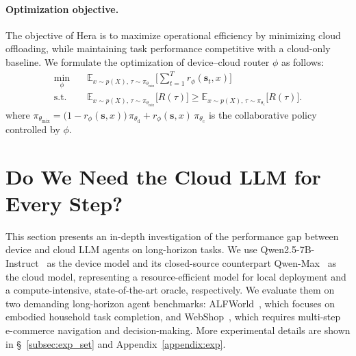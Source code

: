 \documentclass{article}
\newcommand{\name}{Hera\xspace}
\begin{document}
\paragraph{Optimization objective.}
The objective of \name is to maximize operational efficiency by minimizing cloud offloading, while maintaining task performance competitive with a cloud-only baseline.
We formulate the optimization of device--cloud router $\phi$ as follows:
\begin{equation}
\begin{aligned}
\min_{\phi} \quad & 
\mathbb{E}_{x \sim p(X), \, \tau \sim \pi_{\theta_\mathrm{mix}}}
\Bigg[ \sum_{t=1}^T r_\phi(\mathbf{s}_t, x) \Bigg] \\
\text{s.t.} \quad &
\mathbb{E}_{x \sim p(X), \, \tau \sim \pi_{\theta_\mathrm{mix}}}
\big[ R(\tau) \big] 
\ge
\mathbb{E}_{x \sim p(X), \, \tau \sim \pi_{\theta_\mathrm{c}}} 
\big[ R(\tau) \big].
\end{aligned}
\label{eq:opt_obj}
\end{equation}
where $\pi_{\theta_\mathrm{mix}} = \big(1 - r_\phi(\mathbf{s},x)\big)\,\pi_{\theta_\mathrm{d}}+r_\phi(\mathbf{s},x)\,\pi_{\theta_\mathrm{c}}$ is the collaborative policy controlled by $\phi$.

\section{Do We Need the Cloud LLM for Every Step?}
\label{sec:motivation}

This section presents an in-depth investigation of the performance gap between device and cloud LLM agents on long-horizon tasks.
We use Qwen2.5-7B-Instruct~\citep{yang2024qwen25} as the device model and its closed-source counterpart Qwen-Max~\citep{qwen2.5-max2025} as the cloud model, representing a resource-efficient model for local deployment and a compute-intensive, state-of-the-art oracle, respectively.
We evaluate them on two demanding long-horizon agent benchmarks: ALFWorld~\citep{ALFWorld20}, which focuses on embodied household task completion, and WebShop~\citep{yao2022webshop}, which requires multi-step e-commerce navigation and decision-making.
More experimental details are shown in \S~\ref{subsec:exp_set} and Appendix~\ref{appendix:exp}.
\end{document}

